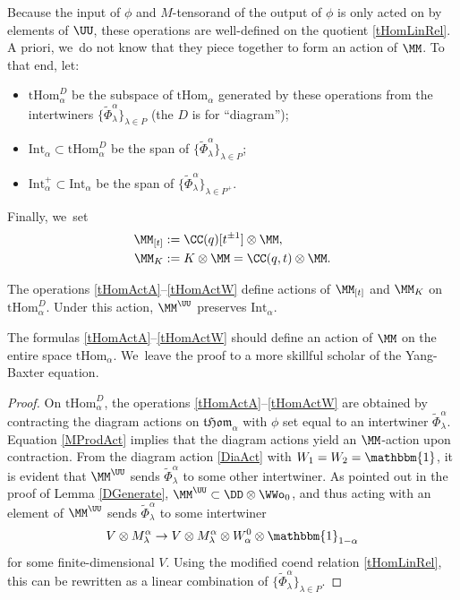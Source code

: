 Because the input of $\phi$ and $M$-tensorand of the output of $\phi$ is only acted on by elements of $\UU$, these operations are well-defined on the quotient \eqref{tHomLinRel}.
{A priori}, we~do not know that they piece together to form an action of $\MM$.
To that end, let:
\begin{itemize}
\item $\mathrm{tHom}_\alpha^{D}$ be the subspace of $\mathrm{tHom}_\alpha$ generated by these operations from the intertwiners $\{ \widetilde{\Phi}_{\lambda}^\alpha \}_{\lambda\in P}$ (the $D$ is for ``diagram'');
\item $\mathrm{Int}_\alpha\subset\mathrm{tHom}_\alpha^{D}$ be the span of $\{ \widetilde{\Phi}_{\lambda}^\alpha \}_{\lambda\in P}$;
\item $\mathrm{Int}_\alpha^+\subset\mathrm{Int}_\alpha$ be the span of $\{\widetilde{\Phi}_\lambda^\alpha\}_{\lambda\in P^+}$.
\end{itemize}
Finally, we~set
\begin{align*}
\MM_{[t]}&:= \CC(q)[t^{\pm 1}] \otimes\MM,\\
\MM_K&:= K\otimes\MM=\CC(q,t)\otimes\MM.
\end{align*}

\begin{lem}
The operations \eqref{tHomActA}--\eqref{tHomActW} define actions of $\MM_{[t]}$ and $\MM_K$ on $\mathrm{tHom}_\alpha^D$.
Under this action, $\MM^\UU$ preserves $\mathrm{Int}_\alpha$.
\end{lem}

\begin{rem}
The formulas \eqref{tHomActA}--\eqref{tHomActW} should define an action of $\MM$ on the entire space $\mathrm{tHom}_\alpha$. We~leave the proof to a more skillful scholar of the Yang-Baxter equation.
\end{rem}

\begin{proof}
On $\mathrm{tHom}_\alpha^D$, the operations \eqref{tHomActA}--\eqref{tHomActW} are obtained by contracting the diagram actions on $\mathfrak{tHom}_\alpha$ with $\phi$ set equal to an intertwiner $\widetilde{\Phi}_\lambda^\alpha$.
Equation \eqref{MProdAct} implies that the diagram actions yield an $\MM$-action upon contraction.
From the diagram action \eqref{DiaAct} with $W_1=W_2=\mathbbm{1}$, it is evident that $\MM^\UU$ sends $\widetilde{\Phi}_\lambda^\alpha$ to some other intertwiner.
As pointed out in the proof of Lemma \ref{DGenerate}, $\MM^\UU\subset\DD\otimes\WWo_0$, and thus acting with an element of $\MM^\UU$ sends $\widetilde{\Phi}_\lambda^\alpha$ to some intertwiner
\[
V\otimes M_{\lambda}^{\alpha}\to V\otimes M_{\lambda}^{\alpha}\otimes W_{\alpha}^0\otimes\mathbbm{1}_{1-\alpha}
\]
for some finite-dimensional $V$.
Using the modified coend relation \eqref{tHomLinRel}, this can be rewritten as a linear combination of $\{\widetilde{\Phi}_\lambda^\alpha\}_{\lambda\in P}$.
\end{proof}

